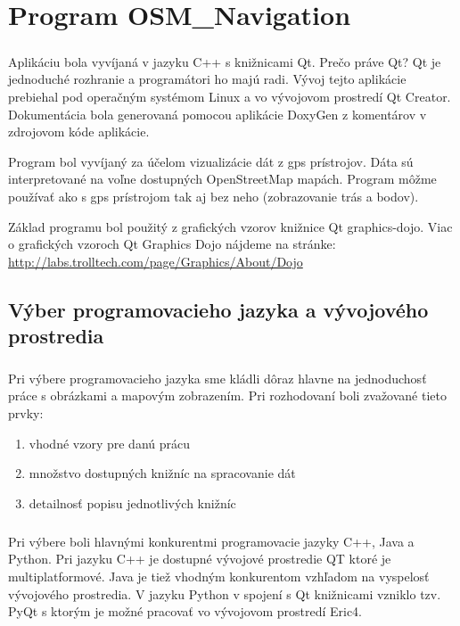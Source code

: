 \chapter{Program OSM\_Navigation}
\paragraph{}
Aplikáciu bola vyvíjaná v jazyku C++ s knižnicami Qt. Prečo práve Qt? Qt je jednoduché rozhranie a programátori ho majú radi. Vývoj tejto aplikácie prebiehal pod operačným systémom Linux a vo vývojovom prostredí Qt Creator. Dokumentácia bola generovaná pomocou aplikácie DoxyGen z komentárov v zdrojovom kóde aplikácie. 

Program bol vyvíjaný za účelom vizualizácie dát z gps prístrojov. Dáta sú interpretované na voľne dostupných OpenStreetMap mapách. Program môžme používať ako s gps prístrojom tak aj bez neho (zobrazovanie trás a bodov). 

Základ programu bol použitý z grafických vzorov knižnice Qt graphics-dojo. Viac o grafických vzoroch Qt Graphics Dojo nájdeme na stránke: \url{http://labs.trolltech.com/page/Graphics/About/Dojo}

\section{Výber programovacieho jazyka a vývojového\\ prostredia}
\paragraph{}Pri výbere programovacieho jazyka sme kládli dôraz hlavne na
jednoduchosť práce s obrázkami a mapovým zobrazením. Pri rozhodovaní boli
zvažované tieto prvky:
\begin{enumerate}
\item vhodné vzory pre danú prácu
\item množstvo dostupných knižníc na spracovanie dát
\item detailnosť popisu jednotlivých knižníc
\end{enumerate}
\paragraph{}
Pri výbere boli hlavnými konkurentmi programovacie jazyky C++, Java a Python.
Pri jazyku C++ je dostupné vývojové prostredie QT ktoré je multiplatformové.
Java je tiež vhodným konkurentom vzhľadom na vyspelosť vývojového prostredia. V
jazyku Python v spojení s Qt knižnicami vzniklo tzv. PyQt s ktorým je možné
pracovať vo vývojovom prostredí Eric4. 

